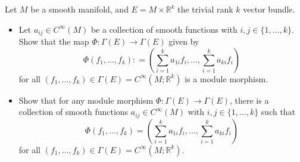 \documentclass{ximera}
\begin{document}
\begin{exercise}
    Let $M$ be a smooth manifold, and $E = M \times \mathbb{R}^k $ the trivial rank $k$ vector bundle. 
    \begin{itemize}
        \item Let $a_{ij} \in C^{\infty}(M)$ be a collection of smooth functions with $i,j \in \{ 1, \ldots , k \}$. Show that the map $\Phi : \Gamma (E) \to \Gamma (E)$ given by 
        \[   \Phi (f_1, \ldots , f_k) : = \left(   \sum _{i = 1} ^k a_{1i} f_i  , \ldots , \sum _{i = 1} ^k a_{ki} f_i  \right)   \]
        for all $(f_1, \ldots , f_k ) \in \Gamma (E) = C^{\infty }(M ; \mathbb{R}^k)$ is a module morphism. 
        \item Show that for any module morphism $\Phi : \Gamma (E) \to \Gamma (E)$, there is a collection of smooth functions $a_{ij} \in C^{\infty}(M)$ with $i,j \in \{ 1, \ldots , k \}$ such that  
        \[   \Phi (f_1, \ldots , f_k) = \left(   \sum _{i = 1} ^k a_{1i} f_i  , \ldots , \sum _{i = 1} ^k a_{ki} f_i  \right)   \]
        for all $(f_1, \ldots , f_k ) \in \Gamma (E) = C^{\infty }(M ; \mathbb{R}^k)$. 
    \end{itemize}
\end{exercise}    
    
\end{document}
